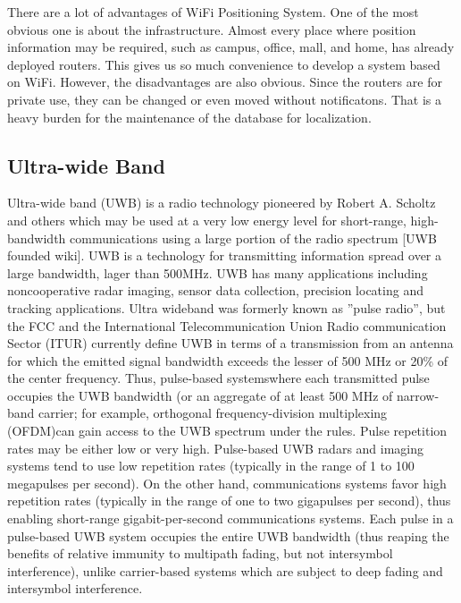 \documentclass[12pt]{report}
\begin{document}
There are a lot of advantages of WiFi Positioning System. One of the most obvious one is about the infrastructure. Almost every place where position information may be required, such as campus, office, mall, and home, has already deployed routers. This gives us so much convenience to develop a system based on WiFi. However, the disadvantages are also obvious. Since the routers are for private use, they can be changed or even moved without notificatons. That is a heavy burden for the maintenance of the database for localization.

\subsection{Ultra-wide Band}
Ultra-wide band (UWB) is a radio technology pioneered by Robert A. Scholtz and others which may be used at a very low energy level for short-range, high-bandwidth communications using a large portion of the radio spectrum [UWB founded wiki]. UWB is a technology for transmitting information spread over a large bandwidth, lager than 500MHz. UWB has many applications including noncooperative radar imaging, sensor data collection, precision locating and tracking applications. Ultra wideband was formerly known as ”pulse radio”, but the FCC and the International Telecommunication Union Radio communication Sector (ITUR) currently define UWB in terms of a transmission from an antenna for which the emitted signal bandwidth exceeds the lesser of 500 MHz or 20\% of the center frequency. Thus, pulse-based systemswhere each transmitted pulse occupies the UWB bandwidth (or an aggregate of at least 500 MHz of narrow-band carrier; for example, orthogonal frequency-division multiplexing (OFDM)can gain access to the UWB spectrum under the rules. Pulse repetition rates may be either low or very high. Pulse-based UWB radars and imaging systems tend to use low repetition rates (typically in the range of 1 to 100 megapulses per second). On the other hand, communications systems favor high repetition rates (typically in the range of one to two gigapulses per second), thus enabling short-range gigabit-per-second communications systems. Each pulse in a pulse-based UWB system occupies the entire UWB bandwidth (thus reaping the benefits of relative immunity to multipath fading, but not intersymbol interference), unlike carrier-based systems which are subject to deep fading and intersymbol interference.
\end{document}
